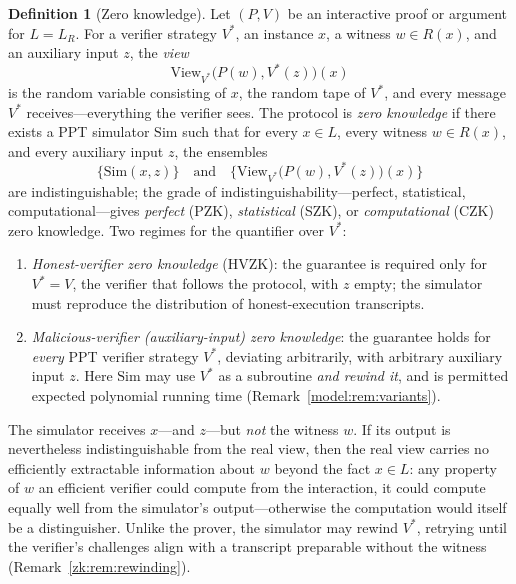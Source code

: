 \documentclass[11pt,a4paper]{article}
\theoremstyle{definition}
\newtheorem{definition}[theorem]{Definition}
\theoremstyle{remark}
\begin{document}
\begin{definition}[Zero knowledge]\label{zk:def:zk}
Let \((P, V)\) be an interactive proof or argument for \(L = L_R\).
For a verifier strategy \(V^{*}\), an instance \(x\), a witness
\(w \in R(x)\), and an auxiliary input \(z\), the \emph{view}
\[
\mathrm{View}_{V^{*}}\bigl(P(w), V^{*}(z)\bigr)(x)
\]
is the random variable consisting of \(x\), the random tape of
\(V^{*}\), and every message \(V^{*}\) receives---everything the
verifier sees. The protocol is \emph{zero knowledge} if there exists
a PPT simulator \(\mathrm{Sim}\) such that for every \(x \in L\),
every witness \(w \in R(x)\), and every auxiliary input \(z\), the
ensembles
\[
\bigl\{ \mathrm{Sim}(x, z) \bigr\}
\quad\text{and}\quad
\bigl\{ \mathrm{View}_{V^{*}}\bigl(P(w), V^{*}(z)\bigr)(x) \bigr\}
\]
are indistinguishable; the grade of indistinguishability---perfect,
statistical, computational---gives \emph{perfect} (PZK),
\emph{statistical} (SZK), or \emph{computational} (CZK) zero
knowledge. Two regimes for the quantifier over \(V^{*}\):
\begin{enumerate}
\item \emph{Honest-verifier zero knowledge} (HVZK): the guarantee is
  required only for \(V^{*} = V\), the verifier that follows the
  protocol, with \(z\) empty; the simulator must reproduce the
  distribution of honest-execution transcripts.
\item \emph{Malicious-verifier (auxiliary-input) zero knowledge}:
  the guarantee holds for \emph{every} PPT verifier strategy
  \(V^{*}\), deviating arbitrarily, with arbitrary auxiliary input
  \(z\). Here \(\mathrm{Sim}\) may use \(V^{*}\) as a subroutine
  \emph{and rewind it}, and is permitted expected polynomial running
  time (Remark~\ref{model:rem:variants}).
\end{enumerate}
\end{definition}

The simulator receives \(x\)---and \(z\)---but \emph{not} the witness
\(w\). If its output is nevertheless indistinguishable from the real
view, then the real view carries no efficiently extractable
information about \(w\) beyond the fact \(x \in L\): any property of
\(w\) an efficient verifier could compute from the interaction, it
could compute equally well from the simulator's output---otherwise
the computation would itself be a distinguisher. Unlike the prover,
the simulator may rewind \(V^{*}\), retrying until the verifier's
challenges align with a transcript preparable without the witness
(Remark~\ref{zk:rem:rewinding}).
\end{document}
